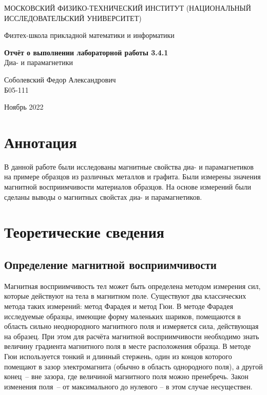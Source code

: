 \documentclass[a4paper,12pt]{article} %
\date{\today}
\begin{document}
\begin{titlepage}
	\begin{center}
		{\large МОСКОВСКИЙ ФИЗИКО-ТЕХНИЧЕСКИЙ ИНСТИТУТ (НАЦИОНАЛЬНЫЙ ИССЛЕДОВАТЕЛЬСКИЙ УНИВЕРСИТЕТ)}
	\end{center}
	\begin{center}
		{\large Физтех-школа прикладной математики и информатики}
	\end{center}
	
	
	\vspace{4.5cm}
	{\huge
		\begin{center}
			{\bf Отчёт о выполнении лабораторной работы 3.4.1}\\
			Диа- и парамагнетики
		\end{center}
	}
	\vspace{1cm}
	\begin{center}
		{\large Соболевский Федор Александрович \\
			\vspace{0.2cm}
			Б05-111}
	\end{center}
	\vspace{8cm}
	\begin{center}
		Ноябрь 2022
	\end{center}
\end{titlepage}

\section{Аннотация}

В данной работе были исследованы магнитные свойства диа- и парамагнетиков на примере образцов из различных металлов и графита. Были измерены значения магнитной восприимчивости материалов образцов. На основе измерений были сделаны выводы о магнитных свойстах диа- и парамагнетиков.

\section{Теоретические сведения}

\subsection{Определение магнитной восприимчивости} 

Магнитная восприимчивость тел может быть определена методом измерения сил, которые действуют на тела в магнитном поле. Существуют два классических метода таких измерений: метод Фарадея и метод Гюи. В методе Фарадея исследуемые образцы, имеющие форму маленьких шариков, помещаются в область сильно неоднородного магнитного поля и измеряется сила, действующая на образец. При этом для расчёта магнитной восприимчивости необходимо знать величину градиента магнитного поля в месте расположения образца. В методе Гюи используется тонкий и длинный стержень, один из концов которого помещают в зазор электромагнита (обычно в область однородного поля), а другой конец~-- вне зазора, где величиной магнитного поля можно пренебречь. Закон изменения поля~-- от максимального до нулевого -- в этом случае несуществен.
\end{document}
